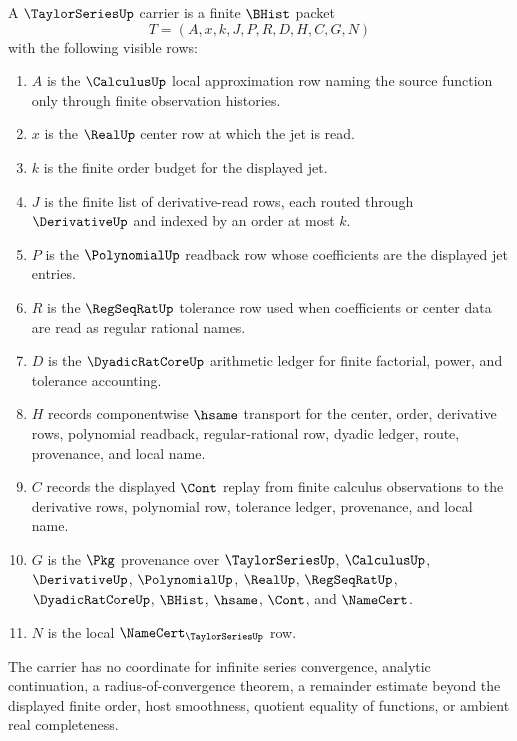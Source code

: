 \begin{definition}
\label{def:taylor-series-carrier}
A $\TaylorSeriesUp$ carrier is a finite $\BHist$ packet
$$
T=(A,x,k,J,P,R,D,H,C,G,N)
$$
with the following visible rows:
\begin{enumerate}
\item $A$ is the $\CalculusUp$ local approximation row naming the source function only through finite observation histories.
\item $x$ is the $\RealUp$ center row at which the jet is read.
\item $k$ is the finite order budget for the displayed jet.
\item $J$ is the finite list of derivative-read rows, each routed through $\DerivativeUp$ and indexed by an order at most $k$.
\item $P$ is the $\PolynomialUp$ readback row whose coefficients are the displayed jet entries.
\item $R$ is the $\RegSeqRatUp$ tolerance row used when coefficients or center data are read as regular rational names.
\item $D$ is the $\DyadicRatCoreUp$ arithmetic ledger for finite factorial, power, and tolerance accounting.
\item $H$ records componentwise $\hsame$ transport for the center, order, derivative rows, polynomial readback, regular-rational row, dyadic ledger, route, provenance, and local name.
\item $C$ records the displayed $\Cont$ replay from finite calculus observations to the derivative rows, polynomial row, tolerance ledger, provenance, and local name.
\item $G$ is the $\Pkg$ provenance over $\TaylorSeriesUp$, $\CalculusUp$, $\DerivativeUp$, $\PolynomialUp$, $\RealUp$, $\RegSeqRatUp$, $\DyadicRatCoreUp$, $\BHist$, $\hsame$, $\Cont$, and $\NameCert$.
\item $N$ is the local $\NameCert_{\TaylorSeriesUp}$ row.
\end{enumerate}
The carrier has no coordinate for infinite series convergence, analytic continuation, a radius-of-convergence theorem, a remainder estimate beyond the displayed finite order, host smoothness, quotient equality of functions, or ambient real completeness.
\end{definition}

